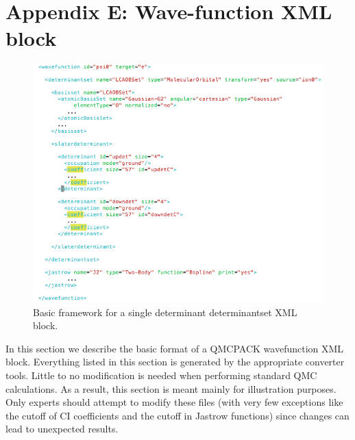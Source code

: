 \newpage
\section{Appendix E: Wave-function XML block}

\begin{figure}[ht!]
\begin{center}
\includegraphics[trim = 0mm 0mm 0mm 0mm, clip,width=1.0\columnwidth]{figures/lab_advanced_molecules_xml_determinantset.png}
\end{center}
\caption{Basic framework for a single determinant determinantset XML block.}
\label{fig:lam_xml_determinantset}
\end{figure}

In this section we describe the basic format of a QMCPACK wavefunction XML block.
Everything listed in this section is generated by the appropriate converter tools. Little to
no modification is needed when performing standard QMC calculations. As a result, this
section is meant mainly for illustration purposes. Only experts should attempt to modify
these files (with very few exceptions like the cutoff of CI coefficients and the cutoff in Jastrow
functions) since changes can lead to unexpected results.

